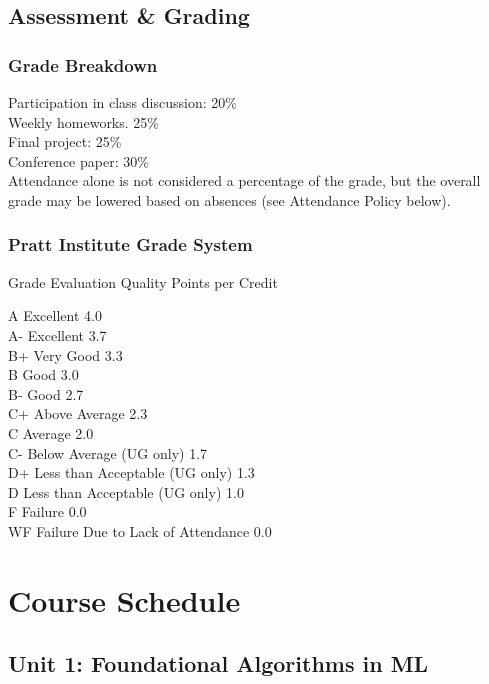\documentclass[12pt]{article}
\begin{document}
\subsection*{Assessment \& Grading}
\label{sec:orgbe567b7}
\subsubsection*{Grade Breakdown}
\label{sec:org3994e6b}
Participation in class discussion: 20\%  \\[0pt]

Weekly homeworks. 25\% \\[0pt]

Final project: 25\% \\[0pt]

Conference paper: 30\% \\[0pt]

Attendance alone is not considered a percentage of the grade, but the
overall grade may be lowered based on absences (see Attendance Policy
below).

\subsubsection*{Pratt Institute Grade System}
\label{sec:org7e8f17c}

Grade Evaluation Quality Points per Credit

A Excellent 4.0 \\[0pt]
A- Excellent 3.7 \\[0pt]
B+ Very Good 3.3 \\[0pt]
B Good 3.0 \\[0pt]
B- Good 2.7 \\[0pt]
C+ Above Average 2.3 \\[0pt]
C Average 2.0 \\[0pt]
C- Below Average (UG only) 1.7 \\[0pt]
D+ Less than Acceptable (UG only) 1.3 \\[0pt]
D Less than Acceptable (UG only) 1.0 \\[0pt]
F Failure 0.0 \\[0pt]
WF Failure Due to Lack of Attendance 0.0 

\section*{Course Schedule}
\label{sec:orgd5ad57f}
\subsection*{Unit 1: Foundational Algorithms in ML}
\label{sec:org8b570b3}
\end{document}
